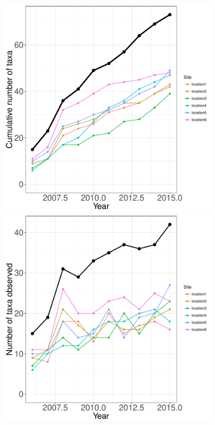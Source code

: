 \documentclass[11pt, oneside]{article}
\begin{document}
\begin{figure}[h!]
\centering
\includegraphics[scale = 0.4]{mcr-algae-castorani_species_accumulation_curve.pdf}
\includegraphics[scale = 0.4]{mcr-algae-castorani_num_taxa_over_time.pdf}

\end{figure}
\end{document}
